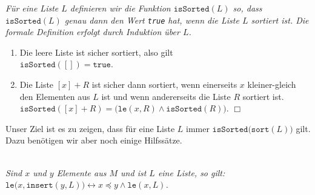 \begin{Definition}
{\em
  F\"ur eine Liste $L$ definieren wir die Funktion $\texttt{isSorted}(L)$ so,
  dass  $\texttt{isSorted}(L)$ genau dann den Wert \texttt{true} hat, wenn die Liste $L$ sortiert ist.
  Die formale Definition erfolgt durch Induktion \"uber $L$.
  \begin{enumerate}
  \item Die leere Liste ist sicher sortiert, also gilt \\[0.1cm]
        \hspace*{1.3cm} 
        $\mathtt{isSorted}([]) = \mathtt{true}$.
  \item Die Liste $[x] + R$ ist sicher dann sortiert, wenn einerseits $x$ kleiner-gleich
        den Elementen aus $L$ ist und wenn andererseits die Liste $R$ sortiert ist. \\[0.1cm]
        \hspace*{1.3cm} 
        $\mathtt{isSorted}([x]+R) = \bigl(\mathtt{le}(x,R) \wedge \mathtt{isSorted}(R)\bigr)$.
        \hspace*{\fill} $\Box$
  \end{enumerate}
}
\end{Definition}
Unser Ziel ist es zu zeigen, dass f\"ur eine
Liste $L$ immer $\texttt{isSorted}\bigl(\mathtt{sort}(L)\bigr)$ gilt.
Dazu ben\"otigen wir aber noch einige Hilfss\"atze.  

\begin{Lemma} \hspace*{\fill} \\
{\em
  Sind $x$ und $y$ Elemente aus $M$ und ist $L$ eine Liste, so gilt: \\[0.1cm]
  \hspace*{1.3cm} 
  $\mathtt{le}\bigl(x, \mathtt{insert}(y,L) \bigr) \leftrightarrow x \preceq y \wedge \mathtt{le}(x,L)$. 
}  
\end{Lemma}

